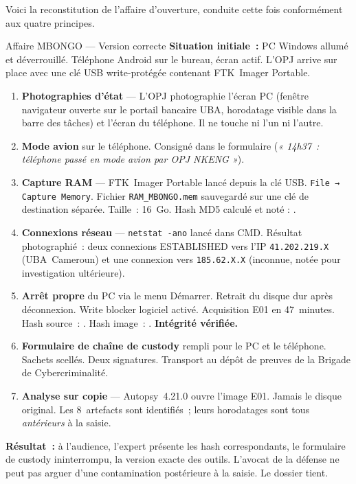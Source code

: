Voici la reconstitution de l'affaire d'ouverture, conduite cette fois
conformément aux quatre principes.

\begin{boxscenario}{Affaire MBONGO --- Version correcte}
\textbf{Situation initiale~:} PC Windows allumé et déverrouillé.
Téléphone Android sur le bureau, écran actif. L'OPJ arrive sur place avec
une clé USB write-protégée contenant FTK~Imager Portable.

\medskip
\begin{enumerate}
    \item \textbf{Photographies d'état} --- L'OPJ photographie l'écran PC
          (fenêtre navigateur ouverte sur le portail bancaire UBA,
          horodatage visible dans la barre des tâches) et l'écran du téléphone.
          Il ne touche ni l'un ni l'autre.

    \item \textbf{Mode avion} sur le téléphone. Consigné dans le formulaire
          (\textit{« 14h37~: téléphone passé en mode avion par OPJ NKENG »}).

    \item \textbf{Capture RAM} --- FTK~Imager Portable lancé depuis la clé
          USB. \texttt{File → Capture Memory}. Fichier \texttt{RAM\_MBONGO.mem}
          sauvegardé sur une clé de destination séparée. Taille~: 16~Go.
          Hash MD5 calculé et noté : .

    \item \textbf{Connexions réseau} --- \texttt{netstat -ano} lancé dans
          CMD. Résultat photographié~: deux connexions ESTABLISHED vers
          l'IP \texttt{41.202.219.X} (UBA~Cameroun) et une connexion vers
          \texttt{185.62.X.X} (inconnue, notée pour investigation ultérieure).

    \item \textbf{Arrêt propre} du PC via le menu Démarrer. Retrait du
          disque dur après déconnexion. Write blocker logiciel activé.
          Acquisition E01 en 47~minutes. Hash source~: .
          Hash image~: . \textbf{Intégrité vérifiée.}

    \item \textbf{Formulaire de chaîne de custody} rempli pour le PC et le
          téléphone. Sachets scellés. Deux signatures. Transport au dépôt
          de preuves de la Brigade de Cybercriminalité.

    \item \textbf{Analyse sur copie} --- Autopsy~4.21.0 ouvre l'image E01.
          Jamais le disque original. Les 8~artefacts sont identifiés~;
          leurs horodatages sont tous \emph{antérieurs} à la saisie.
\end{enumerate}

\textbf{Résultat~:} à l'audience, l'expert présente les hash correspondants,
le formulaire de custody ininterrompu, la version exacte des outils. L'avocat
de la défense ne peut pas arguer d'une contamination postérieure à la saisie.
Le dossier tient.
\end{boxscenario}

